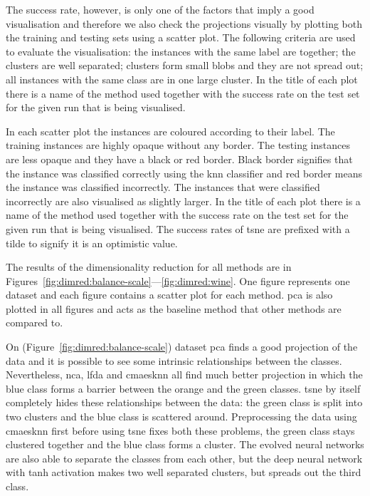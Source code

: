 \documentclass[12pt,a4paper]{report}
\begin{document}


The success rate, however, is only one of the factors that imply a good visualisation and therefore we also check the projections visually by plotting both the training and testing sets using a scatter plot. The following criteria are used to evaluate the visualisation: the instances with the same label are together; the clusters are well separated; clusters form small blobs and they are not spread out; all instances with the same class are in one large cluster. In the title of each plot there is a name of the method used together with the success rate on the test set for the given run that is being visualised.

In each scatter plot the instances are coloured according to their label. The training instances are highly opaque without any border. The testing instances are less opaque and they have a black or red border. Black border signifies that the instance was classified correctly using the \ac{knn} classifier and red border means the instance was classified incorrectly. The instances that were classified incorrectly are also visualised as slightly larger. In the title of each plot there is a name of the method used together with the success rate on the test set for the given run that is being visualised. The success rates of \ac{tsne} are prefixed with a tilde to signify it is an optimistic value.

The results of the dimensionality reduction for all methods are in Figures~\ref{fig:dimred:balance-scale}---\ref{fig:dimred:wine}. One figure represents one dataset and each figure contains a scatter plot for each method. \ac{pca} is also plotted in all figures and acts as the baseline method that other methods are compared to. 

On  (Figure~\ref{fig:dimred:balance-scale}) dataset \ac{pca} finds a good projection of the data and it is possible to see some intrinsic relationships between the classes. Nevertheless, \ac{nca}, \ac{lfda} and \ac{cmaesknn} all find much better projection in which the blue class forms a barrier between the orange and the green classes. \ac{tsne} by itself completely hides these relationships between the data: the green class is split into two clusters and the blue class is scattered around. Preprocessing the data using \ac{cmaesknn} first before using \ac{tsne} fixes both these problems, the green class stays clustered together and the blue class forms a cluster. The evolved neural networks are also able to separate the classes from each other, but the deep neural network with \ac{tanh} activation makes two well separated clusters, but spreads out the third class.
\end{document}
